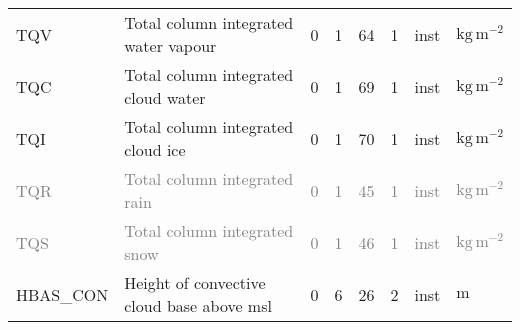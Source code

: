 \begin{longtable}{p{2.0cm}p{5.0cm}p{0.8cm}p{0.8cm}p{0.8cm}p{0.9cm}p{1cm}p{1cm}}
TQV                            &  Total column integrated water vapour                                                  &               0                                   &                     1                       &                    64                      &                 1                           &                      inst                   &        $\mathrm{kg\,m^{-2}}$  \\
TQC                            &  Total column integrated cloud water                                                   &               0                                   &                     1                       &                    69                      &                 1                           &                      inst                   &        $\mathrm{kg\,m^{-2}}$  \\
TQI                            &  Total column integrated cloud ice                                                     &               0                                   &                     1                       &                    70                      &                 1                           &                      inst                   &        $\mathrm{kg\,m^{-2}}$  \\
\textcolor{gray}{TQR}          &  \textcolor{gray}{Total column integrated rain}\footnotemark[3]                        &               \textcolor{gray}{0}                 &                     \textcolor{gray}{1}     &                    \textcolor{gray}{45}    &                 \textcolor{gray}{1}         &                      \textcolor{gray}{inst} &        \textcolor{gray}{$\mathrm{kg\,m^{-2}}$}  \\
\textcolor{gray}{TQS}          &  \textcolor{gray}{Total column integrated snow}\footnotemark[3]                        &               \textcolor{gray}{0}                 &                     \textcolor{gray}{1}     &                    \textcolor{gray}{46}    &                 \textcolor{gray}{1}         &                      \textcolor{gray}{inst} &        \textcolor{gray}{$\mathrm{kg\,m^{-2}}$}  \\
HBAS\_CON                      &  Height of convective cloud base above msl                                             &               0                                   &                     6                       &                    26                      &                 2                           &                      inst                   &        $\mathrm{m}$  \\

\end{longtable}
